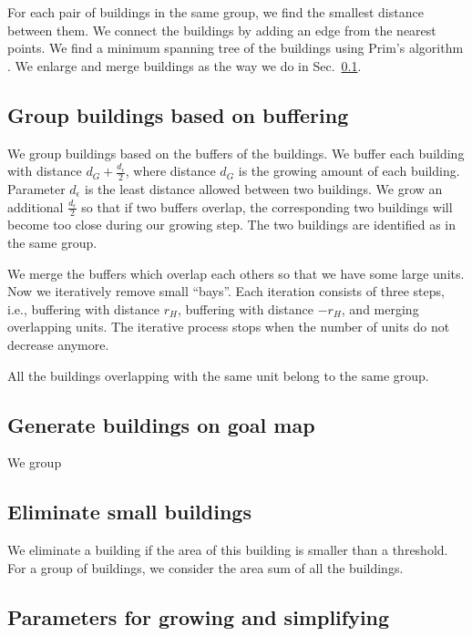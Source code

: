 \documentclass[graybox]{svmult}
\newcommand{\sect}{Sec.~}
\begin{document}
For each pair of buildings in the same group, 
we find the smallest distance between them.
We connect the buildings by adding an edge from the nearest points.
We find a minimum spanning tree of the buildings using Prim's algorithm 
\parencite{Prim1957}.
We enlarge and merge buildings as the way we do in \sect\ref{sec:Grouping}.


\subsection{Group buildings based on buffering}
\label{sec:Grouping}
We group buildings based on the buffers of the buildings. 
We buffer each building with distance $d_G + \frac{d_\epsilon}{2}$, 
where distance $d_G$ is the growing amount of each building. 
Parameter $d_\epsilon$ is the least distance allowed between two buildings.
We grow an additional $\frac{d_\epsilon}{2}$ so that if two buffers overlap, 
the corresponding two buildings will become too close during our growing step.
The two buildings are identified as in the same group.

We merge the buffers which overlap each others so that we have some large units.
Now we iteratively remove small ``bays''.
Each iteration consists of three steps, i.e., 
buffering with distance $r_H$, buffering with distance $-r_H$, and
merging overlapping units.
The iterative process stops when the number of units do not decrease anymore.

All the buildings overlapping with the same unit belong to the same group.


\subsection{Generate buildings on goal map}
\label{sec:Goal}
We group







\subsection{Eliminate small buildings}
\label{sec:Eliminate}
We eliminate a building if the area of this building is smaller than a 
threshold.
For a group of buildings, we consider the area sum of all the buildings.


\subsection{Parameters for growing and simplifying}
\end{document}
